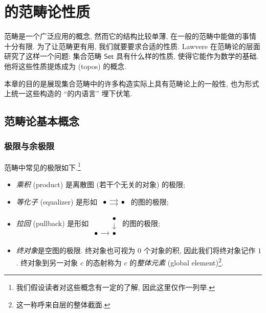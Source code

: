 
\chapter{\topos{}的范畴论性质}


范畴是一个广泛应用的概念, 然而它的结构比较单薄, 在一般的范畴中能做的事情十分有限. 为了让范畴更有用, 我们就要要求合适的性质. Lawvere 在范畴论的层面研究了这样一个问题: 集合范畴 $\mathsf {Set}$ 具有什么样的性质, 使得它能作为数学的基础. 他将这些性质提炼成为\topos{} (topos) 的概念.

本章的目的是展现集合范畴中的许多构造实际上具有范畴论上的一般性, 也为形式上统一这些构造的 ``\topos{}的内语言'' 埋下伏笔.

\section{范畴论基本概念}

\subsection{极限与余极限}

范畴中常见的极限如下.\footnote{我们假设读者对这些概念有一定的了解, 因此这里仅作一列举.}
\begin{itemize}
    \item \emph{乘积} (product) 是离散图 (若干个无关的对象) 的极限;
    \item \emph{等化子} (equalizer) 是形如 $\begin{tikzcd}[ampersand replacement=\&,sep=small]
	\bullet \& \bullet
	\arrow[shift left=1, from=1-1, to=1-2]
	\arrow[shift right=1, from=1-1, to=1-2]
\end{tikzcd}$ 的图的极限;
    \item \emph{拉回} (pullback) 是形如 $\begin{tikzcd}[ampersand replacement=\&,sep=small]
	\& \bullet \\
	\bullet \& \bullet
	\arrow[from=2-1, to=2-2]
	\arrow[from=1-2, to=2-2]
\end{tikzcd}$ 的图的极限;
    \item \emph{终对象}是空图的极限. 终对象也可视为 $0$ 个对象的积, 因此我们将终对象记作 $1$.
    终对象到另一对象 $c$ 的态射称为 $c$ 的\emph{整体元素} (global element)\footnote{这一称呼来自层的整体截面.}.
\end{itemize}

